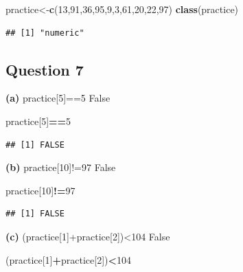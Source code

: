 \documentclass[
  openany]{book}
\newenvironment{Shaded}{\begin{snugshade}}{\end{snugshade}}
\newcommand{\DecValTok}[1]{\textcolor[rgb]{0.00,0.00,0.81}{#1}}
\newcommand{\FunctionTok}[1]{\textcolor[rgb]{0.13,0.29,0.53}{\textbf{#1}}}
\newcommand{\NormalTok}[1]{#1}
\newcommand{\OtherTok}[1]{\textcolor[rgb]{0.56,0.35,0.01}{#1}}
\newcommand{\SpecialCharTok}[1]{\textcolor[rgb]{0.81,0.36,0.00}{\textbf{#1}}}
\begin{document}
\begin{Shaded}
\begin{Highlighting}[]
\NormalTok{practice}\OtherTok{\textless{}{-}}\FunctionTok{c}\NormalTok{(}\DecValTok{13}\NormalTok{,}\DecValTok{91}\NormalTok{,}\DecValTok{36}\NormalTok{,}\DecValTok{95}\NormalTok{,}\DecValTok{9}\NormalTok{,}\DecValTok{3}\NormalTok{,}\DecValTok{61}\NormalTok{,}\DecValTok{20}\NormalTok{,}\DecValTok{22}\NormalTok{,}\DecValTok{97}\NormalTok{)}
\FunctionTok{class}\NormalTok{(practice)}
\end{Highlighting}
\end{Shaded}

\begin{verbatim}
## [1] "numeric"
\end{verbatim}

\subsection{Question 7}\label{question-7}

\textbf{(a)} practice{[}5{]}==5 False

\begin{Shaded}
\begin{Highlighting}[]
\NormalTok{practice[}\DecValTok{5}\NormalTok{]}\SpecialCharTok{==}\DecValTok{5}
\end{Highlighting}
\end{Shaded}

\begin{verbatim}
## [1] FALSE
\end{verbatim}

\textbf{(b)} practice{[}10{]}!=97 False

\begin{Shaded}
\begin{Highlighting}[]
\NormalTok{practice[}\DecValTok{10}\NormalTok{]}\SpecialCharTok{!=}\DecValTok{97} 
\end{Highlighting}
\end{Shaded}

\begin{verbatim}
## [1] FALSE
\end{verbatim}

\textbf{(c)} (practice{[}1{]}+practice{[}2{]})\textless104 False

\begin{Shaded}
\begin{Highlighting}[]
\NormalTok{(practice[}\DecValTok{1}\NormalTok{]}\SpecialCharTok{+}\NormalTok{practice[}\DecValTok{2}\NormalTok{])}\SpecialCharTok{\textless{}}\DecValTok{104}
\end{Highlighting}
\end{Shaded}
\end{document}
